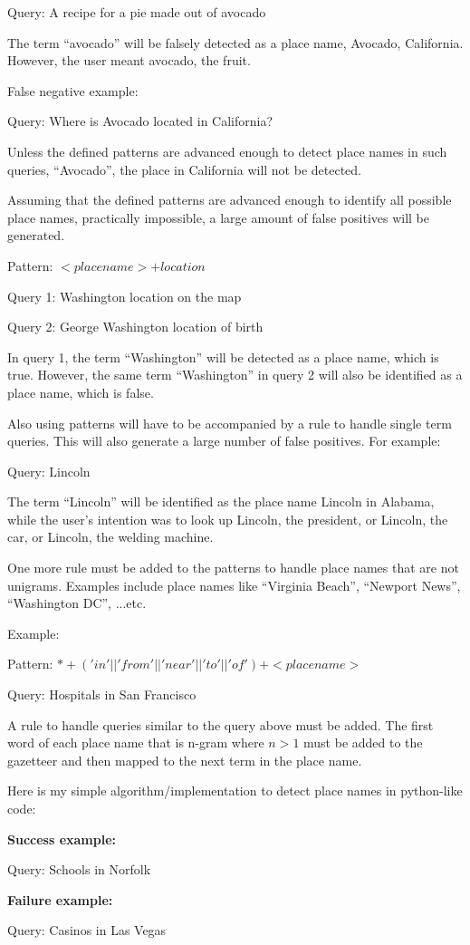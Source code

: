 Query: A recipe for a pie made out of avocado

The term ``avocado'' will be falsely detected as a place name, Avocado, California. However, the user meant avocado, the fruit.

False negative example:

Query: Where is Avocado located in California?

Unless the defined patterns are advanced enough to detect place names in such queries, ``Avocado'', the place in California will not be detected.

Assuming that the defined patterns are advanced enough to identify all possible place names, practically impossible, a large amount of false positives will be generated.

Pattern: $<place name> + location$

Query 1: Washington location on the map

Query 2: George Washington location of birth

In query 1, the term ``Washington'' will be detected as a place name, which is true. However, the same term ``Washington'' in query 2 will also be identified as a place name, which is false.

Also using patterns will have to be accompanied by a rule to handle single term queries. This will also generate a large number of false positives. For example:

Query: Lincoln

The term ``Lincoln'' will be identified as the place name Lincoln in Alabama, while the user's intention was to look up Lincoln, the president, or Lincoln, the car, or Lincoln, the welding machine.

One more rule must be added to the patterns to handle place names that are not unigrams. Examples include place names like ``Virginia Beach'', ``Newport News'', ``Washington DC'', ...etc.

Example:

Pattern: $* + ('in' || 'from' || 'near' || 'to' || 'of' ) + <place name>$

Query: Hospitals in San Francisco

A rule to handle queries similar to the query above must be added. The first word of each place name that is n-gram where $n > 1$ must be added to the gazetteer and then mapped to the next term in the place name.

Here is my simple algorithm/implementation to detect place names in python-like code:




\textbf{Success example:}

Query: Schools in Norfolk

\textbf{Failure example:}

Query: Casinos in Las Vegas